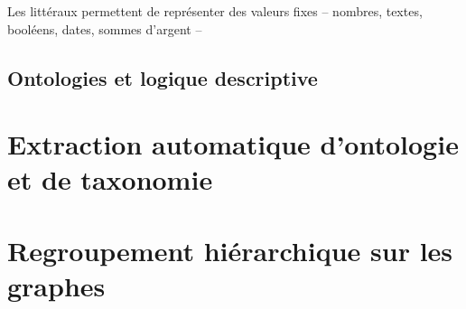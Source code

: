 Les littéraux permettent de représenter des valeurs fixes – nombres, textes, booléens, dates, sommes d'argent – 




\subsection{Ontologies et logique descriptive}





\section{Extraction automatique d'ontologie et de taxonomie}






\section{Regroupement hiérarchique sur les graphes}
